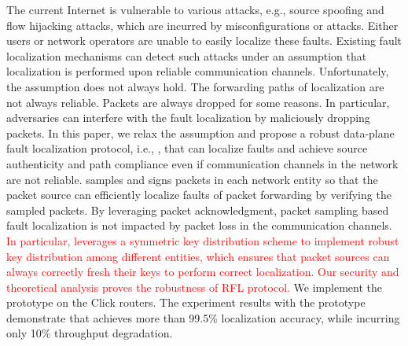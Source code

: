 The current Internet is vulnerable to various attacks, e.g., source spoofing and flow hijacking attacks, which are incurred by misconfigurations or attacks. Either users or network operators are unable to easily localize these faults. Existing fault localization mechanisms can detect such attacks under an assumption that localization is performed upon reliable communication channels. Unfortunately, the assumption does not always  hold. The forwarding paths of localization are not always reliable. Packets are always dropped for some reasons. In particular, adversaries can interfere with the fault localization by maliciously dropping packets.  In this paper, we relax the assumption and propose a robust data-plane fault localization protocol, i.e., \name{},  
that can localize faults and achieve source authenticity and path compliance even if communication channels in the network are not reliable. \name{} samples and signs packets in each network entity so that the packet source can efficiently localize faults of packet forwarding by verifying the sampled packets. %
By leveraging packet acknowledgment, packet sampling based fault localization is not impacted by packet loss in the communication channels. %
\textcolor{red}{In particular, \name leverages a symmetric key distribution scheme to implement robust key distribution among different entities, which ensures that packet sources can always correctly fresh their keys to perform correct localization.} 
\textcolor{red}{Our security and theoretical analysis proves the robustness of RFL protocol.} We implement the  \name{} prototype on the Click routers. The experiment results with the prototype demonstrate that \name{} achieves more than 99.5\% localization accuracy, while incurring only 10\% throughput degradation. 
